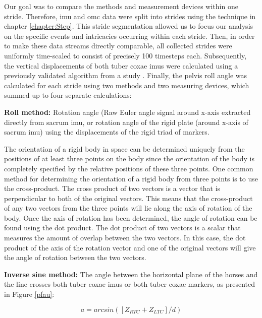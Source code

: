 Our goal was to compare the methods and measurement devices within one stride. Therefore, \gls{imu} and \gls{omc} data were split into strides using the technique in chapter \ref{chapter:Step}. This stride segmentation allowed us to focus our analysis on the specific events and intricacies occurring within each stride. Then, in order to make these data streams directly comparable, all collected strides were uniformly time-scaled to consist of precisely 100 timesteps each. Subsequently, the vertical displacements of both tuber coxae \gls{imu}s were calculated using a previously validated algorithm from a study \cite{pfau_2005_a}. Finally, the pelvis roll angle was calculated for each stride using two methods and two measuring devices, which summed up to four separate calculations: 

\vspace{0.4cm}

\textbf{Roll method:} Rotation angle (Raw Euler angle signal around x-axis extracted directly from sacrum \gls{imu}, or rotation angle of the rigid plate (around x-axis of sacrum \gls{imu}) using the displacements of the rigid triad of markers.

The orientation of a rigid body in space can be determined uniquely from the positions of at least three points on the body since the orientation of the body is completely specified by the relative positions of these three points. One common method for determining the orientation of a rigid body from three points is to use the cross-product. The cross product of two vectors is a vector that is perpendicular to both of the original vectors. This means that the cross-product of any two vectors from the three points will lie along the axis of rotation of the body. Once the axis of rotation has been determined, the angle of rotation can be found using the dot product. The dot product of two vectors is a scalar that measures the amount of overlap between the two vectors. In this case, the dot product of the axis of the rotation vector and one of the original vectors will give the angle of rotation between the two vectors.

\vspace{0.4cm}

\textbf{Inverse sine method:} The angle between the horizontal plane of the horses and the line crosses both tuber coxae \gls{imu}s or both tuber coxae markers, as presented in Figure \ref{pfau}: 

\begin{equation}
    a = arcsin([Z_{RTC} + Z_{LTC}]/d)
\end{equation}

